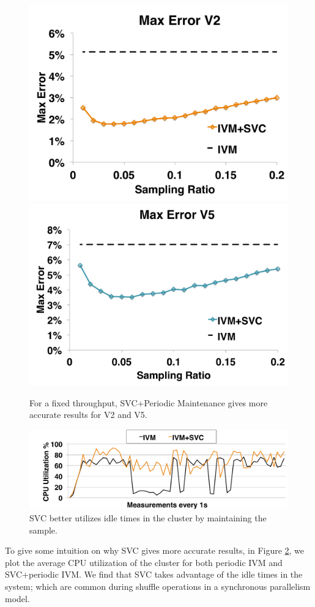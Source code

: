 \begin{figure}[t]
\centering
 \includegraphics[scale=0.14]{exp/con_5.pdf}
 \includegraphics[scale=0.14]{exp/con_6.pdf}
 \caption{For a fixed throughput, SVC+Periodic Maintenance gives more accurate results for V2 and V5. \label{conv-4}} 
\end{figure}

\begin{figure}[t]
\centering
\includegraphics[width=\columnwidth]{exp/con_7.pdf}
 \caption{SVC better utilizes idle times in the cluster by maintaining the sample.\label{conv-5}} 
\end{figure}
To give some intuition on why SVC gives more accurate results, in Figure \ref{conv-5}, we plot the average CPU utilization of the cluster for both periodic IVM and SVC+periodic IVM. 
We find that SVC takes advantage of the idle times in the system; which are common during shuffle operations in a synchronous parallelism model.


